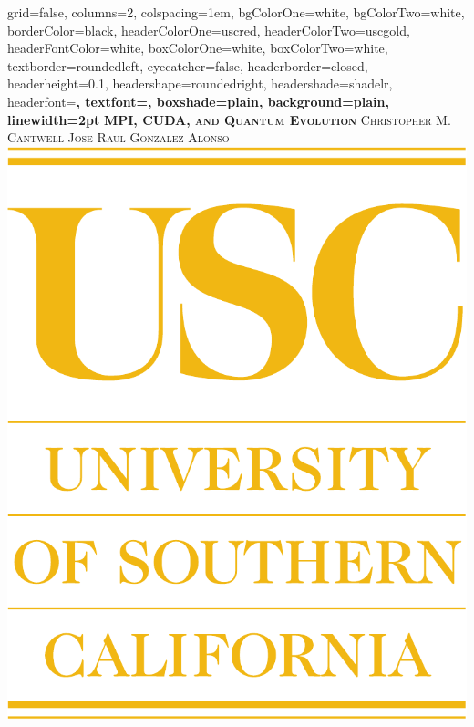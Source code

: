 \documentclass[portrait,paperwidth=24in,paperheight=36in,fontscale=0.5]{baposter}
\begin{document}

\begin{poster}%
  {
  grid=false,
  columns=2,
  colspacing=1em,
  bgColorOne=white,
  bgColorTwo=white,
  borderColor=black,
  headerColorOne=uscred,
  headerColorTwo=uscgold,
  headerFontColor=white,
  boxColorOne=white,
  boxColorTwo=white,
  textborder=roundedleft,
  eyecatcher=false,
  headerborder=closed,
  headerheight=0.1\textheight,
  headershape=roundedright,
  headershade=shadelr,
  headerfont=\Large\bf\textsc, %
  textfont={\setlength{\parindent}{1.5em}},
  boxshade=plain,
  background=plain,
  linewidth=2pt
  }%
  {}
  {\bf\textsc{MPI, CUDA, and Quantum Evolution}\vspace{0.5em}}
  {\textsc{Christopher M. Cantwell \hspace{14.0em} Jose Raul Gonzalez Alonso}\\ }
  {%
    \includegraphics[scale=0.2]{USC.pdf}
}
\end{poster}
\end{document}
